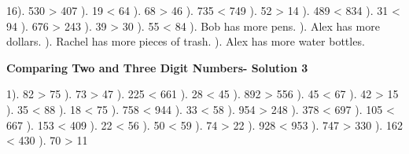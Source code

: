 \documentclass{article}%
\begin{document}
16). 530 > 407%
). 19 < 64%
). 68 > 46%
). 735 < 749%
). 52 > 14%
). 489 < 834%
). 31 < 94%
). 676 > 243%
). 39 > 30%
). 55 < 84%
). Bob has more pens.%
). Alex has more dollars.%
). Rachel has more pieces of trash.%
). Alex has more water bottles.%
\newline%
\newpage%
\large%
\begin{center}%
\textbf{Comparing Two and Three Digit Numbers- Solution 3}%
\newline%
\end{center} \normalsize%
1). 82 > 75%
). 73 > 47%
). 225 < 661%
). 28 < 45%
). 892 > 556%
). 45 < 67%
). 42 > 15%
). 35 < 88%
). 18 < 75%
). 758 < 944%
). 33 < 58%
). 954 > 248%
). 378 < 697%
). 105 < 667%
). 153 < 409%
). 22 < 56%
). 50 < 59%
). 74 > 22%
). 928 < 953%
). 747 > 330%
). 162 < 430%
). 70 > 11%
\newline%
\end{document}
